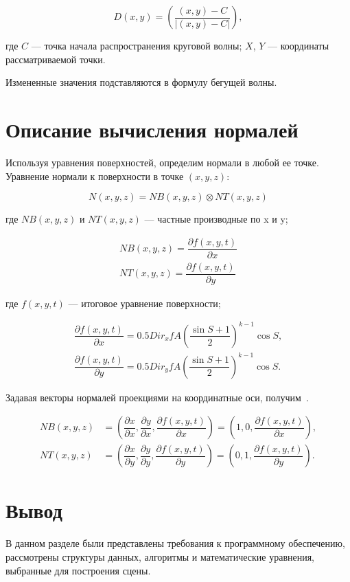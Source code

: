 \begin{equation}
        D(x,y) = \left(\dfrac{(x, y) - C}{|(x, y) - C|}\right),
\end{equation}

где $C$ --- точка начала распространения круговой волны; 
$X$, $Y$ --- координаты рассматриваемой точки.


Измененные значения подставляются в формулу бегущей волны.

\section{Описание вычисления нормалей}

Используя уравнения поверхностей, определим нормали в любой ее точке. 
Уравнение нормали к поверхности в точке $(x, y, z)$:

\begin{equation}
    N(x,y,z) = NB(x,y,z)\otimes NT(x,y,z)
\end{equation}

где $NB(x, y, z)$ и $NT(x, y, z)$ --- частные производные по x и y;

\begin{align}
    NB(x, y, z) = \dfrac{\partial f(x,y,t)}{\partial x} \\
    NT(x, y, z) = \dfrac{\partial f(x,y,t)}{\partial y}
\end{align}

где $f(x, y, t)$ --- итоговое уравнение поверхности;

\begin{align}
    \dfrac{\partial f(x,y,t)}{\partial x} = 0.5Dir_x f A\left(\dfrac{\sin{S} + 1}{2}\right)^{k-1}\cos{S}, \\
    \dfrac{\partial f(x,y,t)}{\partial y} = 0.5Dir_y f A\left(\dfrac{\sin{S} + 1}{2}\right)^{k-1}\cos{S}.
\end{align}


Задавая векторы нормалей проекциями на координатные оси, получим~\cite{WAVE}.

\begin{align}
    NB(x, y, z) &= \left(\dfrac{\partial x}{\partial x}, \dfrac{\partial y}{\partial x}, \dfrac{\partial f(x,y,t)}{\partial x}\right) = \left(1, 0, \dfrac{\partial f(x,y,t)}{\partial x}\right), \\
    NT(x, y, z) &= \left(\dfrac{\partial x}{\partial y}, \dfrac{\partial y}{\partial y}, \dfrac{\partial f(x,y,t)}{\partial y}\right) = \left(0, 1, \dfrac{\partial f(x,y,t)}{\partial y}\right).
\end{align}

\section*{Вывод}
В данном разделе были представлены требования к программному обеспечению, рассмотрены структуры данных, алгоритмы и математические уравнения, выбранные для построения сцены.
